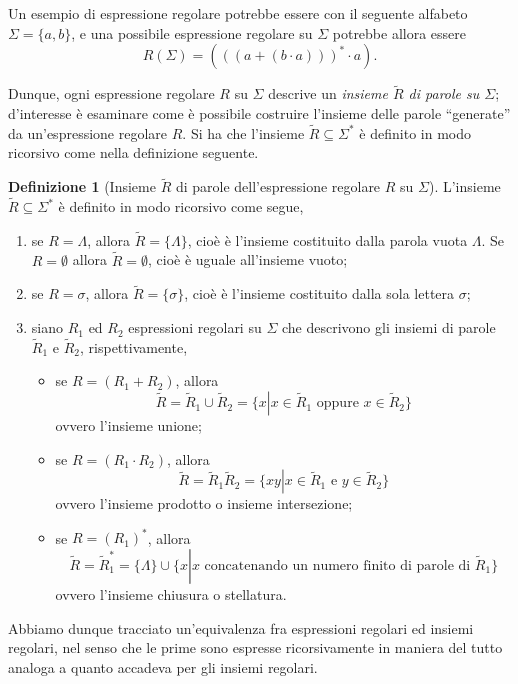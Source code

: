\documentclass[10pt]{\classname}
\theoremstyle{newlinethm}
\theoremstyle{theorem}
\theoremstyle{definition}
\newtheorem{definizione}{Definizione}[section]
\theoremstyle{definition}
\theoremstyle{definition}
\theoremstyle{definition}
\begin{document}
Un esempio di espressione regolare potrebbe essere con il seguente alfabeto $\Sigma = \{a,b\}$, e una possibile espressione regolare su $\Sigma$ potrebbe allora essere \[R (\Sigma) = (((a + (b\cdot a)))^*\cdot a).\]

Dunque, ogni espressione regolare $R$ su $\Sigma$ descrive un \emph{insieme $\tilde{R}$ di parole su $\Sigma$}; d'interesse è esaminare come è possibile costruire l'insieme delle parole ``generate'' da un'espressione regolare $R$. Si ha che l'insieme $\tilde{R}\subseteq \Sigma^*$ è definito in modo ricorsivo come nella definizione seguente.

\begin{definizione}[Insieme $\tilde R$ di parole dell'espressione regolare $R$ su $\Sigma$]
L'insieme $\tilde{R}\subseteq \Sigma^*$ è definito in modo ricorsivo come segue,
    \begin{enumerate}
        \item se $R = \Lambda$, allora $\tilde R = \{\Lambda\}$, cioè è l'insieme costituito dalla parola vuota $\Lambda$. Se $R = \emptyset$ allora $\tilde R = \emptyset$, cioè è uguale all'insieme vuoto;
        \item se $R = \sigma$, allora $\tilde R = \{ \sigma \}$, cioè è l'insieme costituito dalla sola lettera $\sigma$;
        \item siano $R_1$ ed $R_2$ espressioni regolari su $\Sigma$ che descrivono gli insiemi di parole $\tilde R_1$ e $\tilde R_2$, rispettivamente,
        \begin{itemize}
        \item se $R = (R_1 + R_2)$, allora \[\tilde R = \tilde R_1 \cup \tilde R_2 = \{x \left|\right. x \in \tilde R_1 \mbox{ oppure } x \in \tilde R_2\}\] ovvero l'insieme unione;
        \item se $R = (R_1 \cdot R_2)$, allora \[\tilde R = \tilde R_1 \tilde R_2 = \{xy \left|\right. x \in \tilde R_1 \mbox{ e } y \in \tilde R_2\}\] ovvero l'insieme prodotto o insieme intersezione;
        \item se $R = (R_1)^*$, allora \[\tilde R = \tilde R_1^* = \{\Lambda\} \cup \{x \left|\right. x \mbox{ concatenando un numero finito di parole di } \tilde R_1\}\] ovvero l'insieme chiusura o stellatura.
        \end{itemize}
    \end{enumerate}
\end{definizione}

Abbiamo dunque tracciato un'equivalenza fra espressioni regolari ed insiemi regolari, nel senso che le prime sono espresse ricorsivamente in maniera del tutto analoga a quanto accadeva per gli insiemi regolari.
\end{document}
